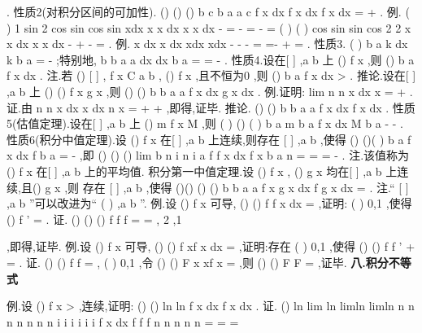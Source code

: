 \int 
\int 
\int 
. 
\textcolor{lyred}{性质2(对积分区间的可加性)}.
()
()
()
b
c
b
a
a
c
f x dx
f x dx
f x dx
=
+
\int 
\int 
\int 
. 
\textcolor{lyred}{例}.
(
)
1 sin 2
cos
sin
cos
sin
xdx
x
x
dx
x
x dx
\pi 
\pi 
\pi 
-
=
-
=
-
=
\int 
\int 
\int 
(
)
(
)
cos
sin
sin
cos
2 2
x
x dx
x
x dx
\pi 
\pi 
\pi 
-
+
-
=
\int 
\int 
. 
\textcolor{lyred}{例}.
x dx
x dx
xdx
xdx
-
-
-
=
=-
+
=
\int 
\int 
\int 
\int 
. 
\textcolor{lyred}{性质3}.
(
)
b
a
k dx
k b
a
\cdots 
=
-
\int 
;特别地,
b
b
a
a
dx
dx
b
a
=
\cdots 
=
-
\int 
\int 
. 
\textcolor{lyred}{性质4}.设在[
]
,a b 上
()
f x \ge 
,则
()
b
a
f x dx \ge 
\int 
. 
\textcolor{lyred}{注}.若
()
[
]
,
f x
C a b
\in 
,
()
f x \ge 
,且不恒为0 ,则
()
b
a
f x dx >
\int 
. 
\textcolor{lyred}{推论}.设在[
]
,a b 上
()
()
f x
g x
\ge 
,则
()
()
b
b
a
a
f x dx
g x dx
\ge 
\int 
\int 
. 
\textcolor{lyred}{例}.证明:
lim
n
n
x
dx
x
\to \infty 
=
+
\int 
. 
证.由
n
n
x
dx
x dx
n
x
\le 
\le 
=
+
+
\int 
\int 
,即得,证毕. 
\textcolor{lyred}{推论}.
()
()
b
b
a
a
f x dx
f x dx
\le 
\int 
\int 
. 
\textcolor{lyred}{性质5(估值定理)}.设在[
]
,a b 上
()
m
f x
M
\le 
\le 
,则 
(
)
()
(
)
b
a
m b
a
f x dx
M b
a
-
\le 
\le 
-
\int 
. 
\textcolor{lyred}{性质6(积分中值定理)}.设
()
f x 在[
]
,a b 上连续,则存在
[
]
,a b
\psi \in 
,使得 
()
()(
)
b
a
f x dx
f
b
a
\psi 
=
-
\int 
,即
()
()
()
lim
b
n
i
n
i
a
f
f x dx
f x
b
a
n
\psi 
\to \infty 
=
=
=
-
\sum 
\int 
. 
\textcolor{lyred}{注}.该值称为
()
f x 在[
]
,a b 上的\textcolor{lyred}{平均值}. 
\textcolor{lyred}{积分第一中值定理}.设
()
f x , ()
g x 均在[
]
,a b 上连续,且()
g x \ge 
,则 
存在
[
]
,a b
\psi \in 
,使得
()()
()
()
b
b
a
a
f x g x dx
f
g x dx
\psi 
=
\int 
\int 
. 
\textcolor{lyred}{注}.“
[
]
,a b
\psi 
\exists \in 
”可以改进为“
(
)
,a b
\psi 
\exists \in 
”. 
\textcolor{lyred}{例}.设
()
f x 可导,
()
()
f
f x dx
=\int 
,证明:
(
)
0,1
\psi 
\exists \in 
,使得
()
f
\psi 
'
=
. 
证.
()
()
()
f
f
f
\eta 
\eta 
=
\cdots 
=
,
2 ,1
\eta 


\in 



,即得,证毕. 
\textcolor{lyred}{例}.设
()
f x 可导,
()
()
f
xf x dx
=\int 
,证明:存在
(
)
0,1
\psi \in 
,使得
()
()
f
f
\psi 
\psi 
\psi 
'
+
=
. 
证.
()
()
f
f
\eta 
\eta 
=
,
(
)
0,1
\eta \in 
,令
()
()
F x
xf x
=
,则
()
()
F
F \eta 
=
,证毕. 
\vspace{4pt}
{\bfseries \textcolor{lyred}{八.积分不等式}}

\textcolor{lyred}{例}.设
()
f x >
,连续,证明:
()
()
ln
ln
f x dx
f x dx
\le 
\int 
\int 
. 
证.
()
ln
lim
ln
limln
limln
n
n
n
n
n
n
n
i
i
i
i
i
i
f x dx
f
f
f
n
n
n
n
n
\to \infty 
\to \infty 
\to \infty 
=
=
=






